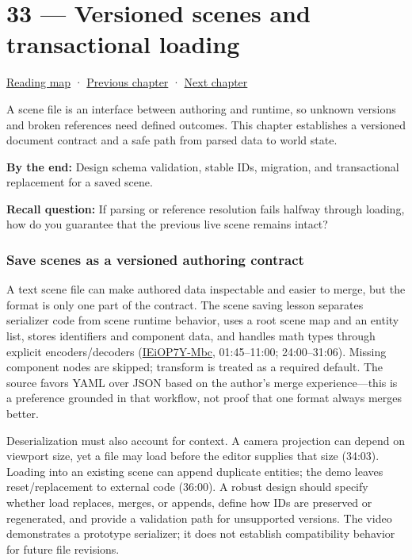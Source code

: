 \hypertarget{06-engine-ii-ch033}{}
\section{33 --- Versioned scenes and transactional loading}\label{versioned-scenes-and-transactional-loading}

\href{Chapter\%20Edition/03\%20-\%20Game\%20Engine/00\%20-\%20Reading\%20Map}{Reading map} · \hyperref[06-engine-ii-ch032]{Previous chapter} · \hyperref[06-engine-ii-ch034]{Next chapter}

A scene file is an interface between authoring and runtime, so unknown versions and broken references need defined outcomes. This chapter establishes a versioned document contract and a safe path from parsed data to world state.

\textbf{By the end:} Design schema validation, stable IDs, migration, and transactional replacement for a saved scene.

\textbf{Recall question:} If parsing or reference resolution fails halfway through loading, how do you guarantee that the previous live scene remains intact?

\subsubsection{Save scenes as a versioned authoring contract}\label{save-scenes-as-a-versioned-authoring-contract}

A text scene file can make authored data inspectable and easier to merge, but the format is only one part of the contract. The scene saving lesson separates serializer code from scene runtime behavior, uses a root scene map and an entity list, stores identifiers and component data, and handles math types through explicit encoders/decoders (\href{https://www.youtube.com/watch?v=IEiOP7Y-Mbc}{IEiOP7Y-Mbc}, 01:45--11:00; 24:00--31:06). Missing component nodes are skipped; transform is treated as a required default. The source favors YAML over JSON based on the author's merge experience---this is a preference grounded in that workflow, not proof that one format always merges better.

Deserialization must also account for context. A camera projection can depend on viewport size, yet a file may load before the editor supplies that size (34:03). Loading into an existing scene can append duplicate entities; the demo leaves reset/replacement to external code (36:00). A robust design should specify whether load replaces, merges, or appends, define how IDs are preserved or regenerated, and provide a validation path for unsupported versions. The video demonstrates a prototype serializer; it does not establish compatibility behavior for future file revisions.

